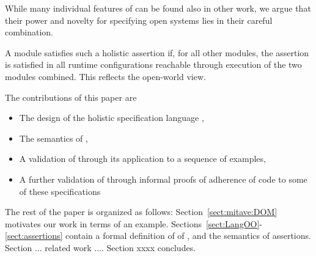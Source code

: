 While many individual features of \Chainmail can be found also in other work, 
we argue that their power and novelty for specifying open systems lies in their careful combination.
 
A module satisfies such a holistic assertion if, for all other modules,
  the assertion is satisfied  in all runtime configurations reachable through execution of the two modules combined.
  This reflects the open-world view.
  
The contributions of this paper are
\begin{itemize}
\item The design of the holistic specification language \Chainmail,
\item The semantics of \Chainmail,
\item A validation of \Chainmail through its application to a sequence of examples,
\item A further validation of \Chainmail through informal proofs of adherence of code to some of these specifications
\end{itemize}  
  
  
The rest of the paper is organized as follows: Section~\ref{sect:mitave:DOM} 
motivates our work in terms of an example. Sections~\ref{sect:LangOO}-\ref{sect:assertions} contain a formal definition of of \LangOO, and the semantics of assertions. Section ... related work .... Section xxxx concludes.

  
   

 


